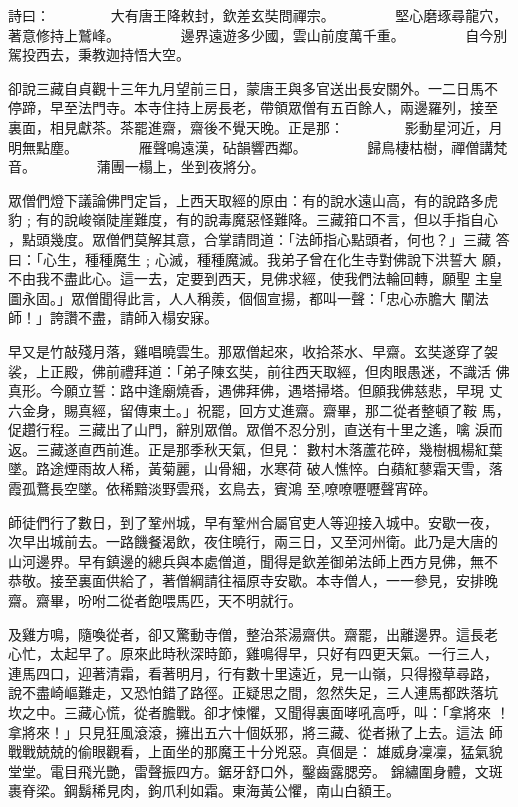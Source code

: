 \begin{pinyinscope}
{詩曰：
　　　　大有唐王降敕封，欽差玄奘問禪宗。
　　　　堅心磨琢尋龍穴，著意修持上鷲峰。
　　　　邊界遠遊多少國，雲山前度萬千重。
　　　　自今別駕投西去，秉教迦持悟大空。

卻說三藏自貞觀十三年九月望前三日，蒙唐王與多官送出長安關外。一二日馬不
停蹄，早至法門寺。本寺住持上房長老，帶領眾僧有五百餘人，兩邊羅列，接至
裏面，相見獻茶。茶罷進齋，齋後不覺天晚。正是那：
　　　　影動星河近，月明無點塵。
　　　　雁聲鳴遠漢，砧韻響西鄰。
　　　　歸鳥棲枯樹，禪僧講梵音。
　　　　蒲團一榻上，坐到夜將分。

眾僧們燈下議論佛門定旨，上西天取經的原由：有的說水遠山高，有的說路多虎
豹﹔有的說峻嶺陡崖難度，有的說毒魔惡怪難降。三藏箝口不言，但以手指自心
，點頭幾度。眾僧們莫解其意，合掌請問道：「法師指心點頭者，何也？」三藏
答曰：「心生，種種魔生﹔心滅，種種魔滅。我弟子曾在化生寺對佛說下洪誓大
願，不由我不盡此心。這一去，定要到西天，見佛求經，使我們法輪回轉，願聖
主皇圖永固。」眾僧聞得此言，人人稱羨，個個宣揚，都叫一聲：「忠心赤膽大
闡法師！」誇讚不盡，請師入榻安寐。

早又是竹敲殘月落，雞唱曉雲生。那眾僧起來，收拾茶水、早齋。玄奘遂穿了袈
裟，上正殿，佛前禮拜道：「弟子陳玄奘，前往西天取經，但肉眼愚迷，不識活
佛真形。今願立誓：路中逢廟燒香，遇佛拜佛，遇塔掃塔。但願我佛慈悲，早現
丈六金身，賜真經，留傳東土。」祝罷，回方丈進齋。齋畢，那二從者整頓了鞍
馬，促趲行程。三藏出了山門，辭別眾僧。眾僧不忍分別，直送有十里之遙，噙
淚而返。三藏遂直西前進。正是那季秋天氣，但見：
數村木落蘆花碎，幾樹楓楊紅葉墜。路途煙雨故人稀，黃菊麗，山骨細，水寒荷
破人憔悴。白蘋紅蓼霜天雪，落霞孤鶩長空墜。依稀黯淡野雲飛，玄鳥去，賓鴻
至,嘹嘹嚦嚦聲宵碎。

師徒們行了數日，到了鞏州城，早有鞏州合屬官吏人等迎接入城中。安歇一夜，
次早出城前去。一路饑餐渴飲，夜住曉行，兩三日，又至河州衛。此乃是大唐的
山河邊界。早有鎮邊的總兵與本處僧道，聞得是欽差御弟法師上西方見佛，無不
恭敬。接至裏面供給了，著僧綱請往福原寺安歇。本寺僧人，一一參見，安排晚
齋。齋畢，吩咐二從者飽喂馬匹，天不明就行。

及雞方鳴，隨喚從者，卻又驚動寺僧，整治茶湯齋供。齋罷，出離邊界。這長老
心忙，太起早了。原來此時秋深時節，雞鳴得早，只好有四更天氣。一行三人，
連馬四口，迎著清霜，看著明月，行有數十里遠近，見一山嶺，只得撥草尋路，
說不盡崎嶇難走，又恐怕錯了路徑。正疑思之間，忽然失足，三人連馬都跌落坑
坎之中。三藏心慌，從者膽戰。卻才悚懼，又聞得裏面哮吼高呼，叫：「拿將來
！拿將來！」只見狂風滾滾，擁出五六十個妖邪，將三藏、從者揪了上去。這法
師戰戰兢兢的偷眼觀看，上面坐的那魔王十分兇惡。真個是：
雄威身凜凜，猛氣貌堂堂。電目飛光艷，雷聲振四方。鋸牙舒口外，鑿齒露腮旁。
錦繡圍身體，文斑裹脊梁。鋼鬍稀見肉，鉤爪利如霜。東海黃公懼，南山白額王。

}
\end{pinyinscope}
